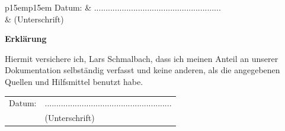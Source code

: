 \documentclass[12pt,a4paper,bibliography=totocnumbered,listof=totocnumbered]{scrartcl}
\begin{document}
\vspace{4em}
\begin{minipage}{\linewidth}
	\begin{tabular}{p{15em}p{15em}}
		Datum: &  .......................................................\\
		& \centering (Unterschrift)\\
	\end{tabular}
\end{minipage}

\newpage
\thispagestyle{empty}
\begin{center}
	\vspace*{5em}
	\huge\textbf{Erklärung}\\
\end{center}
\vspace{2em}
Hiermit versichere ich, Lars Schmalbach, dass ich meinen Anteil an unserer Dokumentation selbständig verfasst und keine anderen, als die angegebenen Quellen und Hilfsmittel benutzt habe.

\vspace{4em}
\begin{minipage}{\linewidth}
	\begin{tabular}{p{15em}p{15em}}
		Datum: &  .......................................................\\
		& \centering (Unterschrift)\\
	\end{tabular}
\end{minipage}
\end{document}
